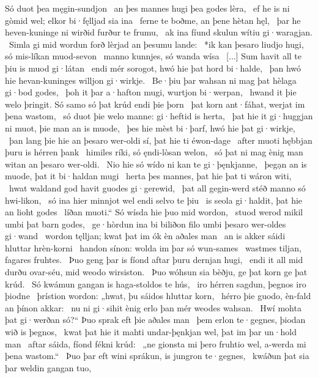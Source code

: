 Só duot þea męgin-sundjon \hld\ an þes mannes hugi
þea godes lèra, \hld\ ef he is ni gòmid wel;
elkor bi·fęlljad sia ina \hld\ ferne te boðme,
an þene hètan hęl, \hld\ þar he heven-kuninge
ni wirðid furður te frumu, \hld\ ak ina fíund skulun
wítiu gi·waragjan. \hld\ Simla gi mid wordun forð
lèrjad an þesumu lande: \hld\ *ik kan þesaro liudjo hugi,
só mis-líkan muod-sevon \hld\ manno kunnjes,
só wanda wísa \hld\ [...]
Sum havit all te þiu is muod gi·látan \hld\ endi mér sorogot,
hwó hie þat hord bi·halde, \hld\ þan hwó hie hevan-kuninges
willjon gi·wirkje. \hld\ Be·þiu þar wahsan ni mag
þat hèlaga gi·bod godes, \hld\ þoh it þar a·hafton mugi,
wurtjon bi·werpan, \hld\ hwand it þie welo þringit.
Só samo só þat krúd endi þie þorn \hld\ þat korn ant·fáhat,
werjat im þena wastom, \hld\ só duot þie welo manne:
gi·heftid is herta, \hld\ þat hie it gi·huggjan ni muot,
þie man an is muode, \hld\ þes hie mèst bi·þarf,
hwó hie þat gi·wirkje, \hld\ þan lang þie hie an þesaro wer-oldi sí,
þat hie ti éwon-dage \hld\ after muoti
hębbjan þuru is hérren þank \hld\ himiles ríki,
só ęndi-lòsan welon, \hld\ só þat ni mag ènig man
witan an þesaro wer-oldi. \hld\ Nio hie só wído ni kan
te gi·þęnkjanne, \hld\ þegạn an is muode,
þat it bi·haldan mugi \hld\ herta þes mannes,
þat hie þat ti wáron witi, \hld\ hwat waldand god havit
guodes gi·gerewid, \hld\ þat all gegin-werd stéð
manno só hwi-likon, \hld\ só ina hier minnjot wel
endi selvo te þiu \hld\ is seola gi·haldit,
þat hie an lioht godes \hld\ líðan muoti.“
Só wísda hie þuo mid wordon, \hld\ stuod werod mikil
umbi þat barn godes, \hld\ ge·hòrdun ina bi biliðon filo
umbi þesaro wer-oldes gi·wand \hld\ wordon tęlljan;
kwat þat im ók èn aðales man \hld\ an is akker sáidi
hluttar hrèn-korni \hld\ handon sínon:
wolda im þar só wun-sames \hld\ wastmes tiljan,
fagares fruhtes. \hld\ Þuo geng þar is fíond aftar
þuru dernjan hugi, \hld\ endi it all mid durðu ovar-séu,
mid weodo wirsiston. \hld\ Þuo wóhsun sia bèðju,
ge þat korn ge þat krúd. \hld\ Só kwámun gangan
is haga-stoldos te hús, \hld\ iro hérren sagdun,
þegnos iro þiodne \hld\ þrístion wordon:
„hwat, þu sáidos hluttar korn, \hld\ hérro þie guodo,
èn-fald an þínon akkar: \hld\ nu ni gi·sihit ènig erlo þan mér
weodes wahsan. \hld\ Hwí mohta þat gi·werðan só?“
Þuo sprak eft þie aðales man \hld\ þem erlon te·gegnes,
þiodan wið is þegnos, \hld\ kwat þat hie it mahti undar-þęnkjan wel,
þat im þar un·hold man \hld\ aftar sáida,
fíond fékni krúd: \hld\ „ne gionsta mi þero fruhtio wel,
a-werda mi þena wastom.“ \hld\ Þuo þar eft wini sprákun,
is jungron te·gegnes, \hld\ kwáðun þat sia þar weldin gangan tuo,
